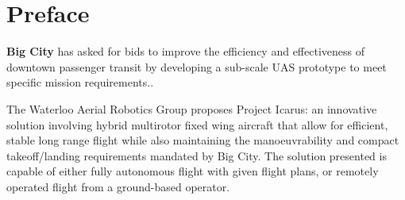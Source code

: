 \section{Preface}
\label{sec:preface}

\textbf{Big City} has asked for bids to improve the efficiency and
effectiveness of downtown passenger transit by developing a sub-scale UAS
prototype to meet specific mission requirements..

The Waterloo Aerial Robotics Group proposes Project Icarus: an innovative
solution involving hybrid multirotor fixed wing aircraft that allow for
efficient, stable long range flight while also maintaining the manoeuvrability
and compact takeoff/landing requirements mandated by Big City. The solution
presented is capable of either fully autonomous flight with given flight plans,
or remotely operated flight from a ground-based operator.
